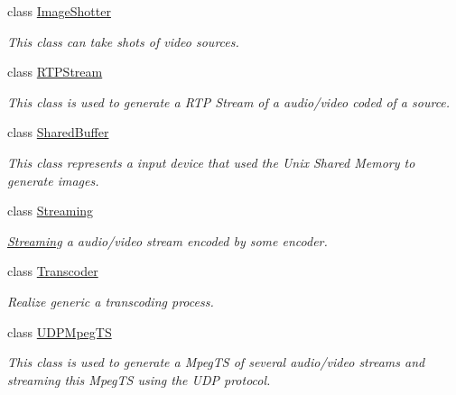 \begin{DoxyCompactItemize}
class \hyperlink{classbr_1_1ufscar_1_1lince_1_1streaming_1_1ImageShotter}{ImageShotter}
\begin{DoxyCompactList}\small\item\em This class can take shots of video sources. \item\end{DoxyCompactList}\item 
class \hyperlink{classbr_1_1ufscar_1_1lince_1_1streaming_1_1RTPStream}{RTPStream}
\begin{DoxyCompactList}\small\item\em This class is used to generate a RTP Stream of a audio/video coded of a source. \item\end{DoxyCompactList}\item 
class \hyperlink{classbr_1_1ufscar_1_1lince_1_1streaming_1_1SharedBuffer}{SharedBuffer}
\begin{DoxyCompactList}\small\item\em This class represents a input device that used the Unix Shared Memory to generate images. \item\end{DoxyCompactList}\item 
class \hyperlink{classbr_1_1ufscar_1_1lince_1_1streaming_1_1Streaming}{Streaming}
\begin{DoxyCompactList}\small\item\em \hyperlink{classbr_1_1ufscar_1_1lince_1_1streaming_1_1Streaming}{Streaming} a audio/video stream encoded by some encoder. \item\end{DoxyCompactList}\item 
class \hyperlink{classbr_1_1ufscar_1_1lince_1_1streaming_1_1Transcoder}{Transcoder}
\begin{DoxyCompactList}\small\item\em Realize generic a transcoding process. \item\end{DoxyCompactList}\item 
class \hyperlink{classbr_1_1ufscar_1_1lince_1_1streaming_1_1UDPMpegTS}{UDPMpegTS}
\begin{DoxyCompactList}\small\item\em This class is used to generate a MpegTS of several audio/video streams and streaming this MpegTS using the UDP protocol. \item\end{DoxyCompactList}\item 

\end{DoxyCompactItemize}
